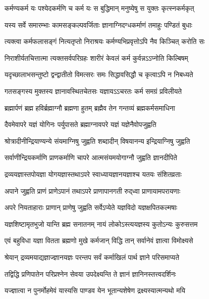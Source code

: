 \twolineshloka
{कर्मण्यकर्म यः पश्येदकर्मणि च कर्म यः}
{स बुद्धिमान् मनुष्येषु स युक्तः कृत्स्नकर्मकृत्}%

\twolineshloka
{यस्य सर्वे समारम्भाः कामसङ्कल्पवर्जिताः}
{ज्ञानाग्निदग्धकर्माणं तमाहुः पण्डितं बुधाः}%

\twolineshloka
{त्यक्त्वा कर्मफलासङ्गं नित्यतृप्तो निराश्रयः}
{कर्मण्यभिप्रवृत्तोऽपि नैव किञ्चित् करोति सः}%

\twolineshloka
{निराशीर्यतचित्तात्मा त्यक्तसर्वपरिग्रहः}
{शारीरं केवलं कर्म कुर्वन्नऽऽप्नोति किल्बिषम्}%

\twolineshloka
{यदृच्छालाभसन्तुष्टो द्वन्द्वातीतो विमत्सरः}
{समः सिद्धावसिद्धौ च कृत्वाऽपि न निबध्यते}%

\twolineshloka
{गतसङ्गस्य मुक्तस्य ज्ञानावस्थितचेतसः}
{यज्ञायऽऽचरतः कर्म समग्रं प्रविलीयते}%

\twolineshloka
{ब्रह्मार्पणं ब्रह्म हविर्ब्रह्माग्नौ ब्रह्मणा हुतम्}
{ब्रह्मैव तेन गन्तव्यं ब्रह्मकर्मसमाधिना}%

\twolineshloka
{दैवमेवापरे यज्ञं योगिनः पर्युपासते}
{ब्रह्माग्नावपरे यज्ञं यज्ञेनैवोपजुह्वति}%

\twolineshloka
{श्रोत्रादीनीन्द्रियाण्यन्ये संयमाग्निषु जुह्वति}
{शब्दादीन् विषयानन्य इन्द्रियाग्निषु जुह्वति}%

\twolineshloka
{सर्वाणीन्द्रियकर्माणि प्राणकर्माणि चापरे}
{आत्मसंयमयोगाग्नौ जुह्वति ज्ञानदीपिते}%

\twolineshloka
{द्रव्ययज्ञास्तपोयज्ञा योगयज्ञास्तथाऽपरे}
{स्वाध्यायज्ञानयज्ञाश्च यतयः संशितव्रताः}%

\twolineshloka
{अपाने जुह्वति प्राणं प्राणेऽपानं तथाऽपरे}
{प्राणापानगती रुद्‌ध्वा प्राणायामपरायणाः}%

\twolineshloka
{अपरे नियताहाराः प्राणान् प्राणेषु जुह्वति}
{सर्वेऽप्येते यज्ञविदो यज्ञक्षपितकल्मषाः}%

\twolineshloka
{यज्ञशिष्टामृतभुजो यान्ति ब्रह्म सनातनम्}
{नायं लोकोऽस्त्ययज्ञस्य कुतोऽन्यः कुरुसत्तम}%

\twolineshloka
{एवं बहुविधा यज्ञा वितता ब्रह्मणो मुखे}
{कर्मजान् विद्धि तान् सर्वानेवं ज्ञात्वा विमोक्ष्यसे}%

\twolineshloka
{श्रेयान् द्रव्यमयाद्यज्ञाज्ज्ञानयज्ञः परन्तप}
{सर्वं कर्माखिलं पार्थ ज्ञाने परिसमाप्यते}%

\twolineshloka
{तद्विद्धि प्रणिपातेन परिप्रश्नेन सेवया}
{उपदेक्ष्यन्ति ते ज्ञानं ज्ञानिनस्तत्त्वदर्शिनः}%

\twolineshloka
{यज्ज्ञात्वा न पुनर्मोहमेवं यास्यसि पाण्डव}
{येन भूतान्यशेषेण द्रक्ष्यस्यात्मन्यथो मयि}%

